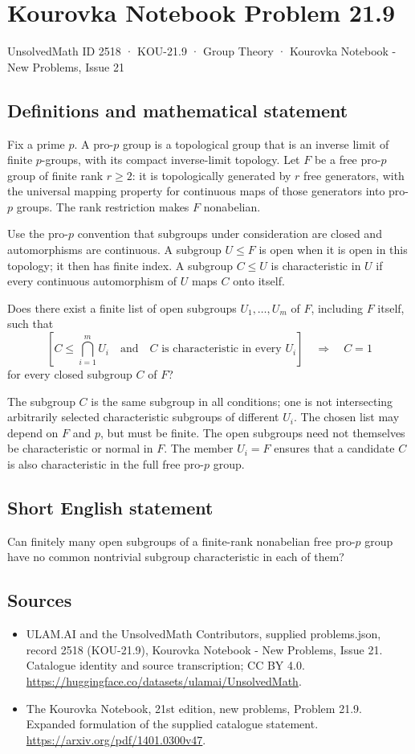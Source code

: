 \documentclass[11pt,a4paper]{article}
\begin{document}
\section*{Kourovka Notebook Problem 21.9}\label{2518}
{\small UnsolvedMath ID 2518 · KOU-21.9 · Group Theory · Kourovka Notebook - New Problems, Issue 21}
\subsection{Definitions and mathematical statement}
Fix a prime $p$. A pro-$p$ group is a topological group that is an
inverse limit of finite $p$-groups, with its compact inverse-limit topology.
Let $F$ be a free pro-$p$ group of finite rank $r\ge2$: it is topologically
generated by $r$ free generators, with the universal mapping property
for continuous maps of those generators into pro-$p$ groups.
The rank restriction makes $F$ nonabelian.

Use the pro-$p$ convention that subgroups under consideration are closed
and automorphisms are continuous. A subgroup $U\le F$ is open when it
is open in this topology; it then has finite index. A subgroup $C\le U$
is characteristic in $U$ if every continuous automorphism of $U$ maps
$C$ onto itself.

Does there exist a finite list of open subgroups $U_1,\ldots,U_m$ of
$F$, including $F$ itself, such that
\[
 \left[C\le\bigcap_{i=1}^m U_i\quad\text{and}\quad
       C\text{ is characteristic in every }U_i\right]
 \quad\Longrightarrow\quad C=1
\]
for every closed subgroup $C$ of $F$?

The subgroup $C$ is the same subgroup in all conditions; one is not
intersecting arbitrarily selected characteristic subgroups of different
$U_i$. The chosen list may depend on $F$ and $p$, but must be finite.
The open subgroups need not themselves be characteristic or normal in
$F$. The member $U_i=F$ ensures that a candidate $C$ is also characteristic
in the full free pro-$p$ group.
\subsection{Short English statement}
Can finitely many open subgroups of a finite-rank nonabelian free pro-$p$ group have no common nontrivial subgroup characteristic in each of them?
\subsection{Sources}
\begin{itemize}
\item[S1] ULAM.AI and the UnsolvedMath Contributors, supplied problems.json, record 2518 (KOU-21.9), Kourovka Notebook - New Problems, Issue 21. Catalogue identity and source transcription; CC BY 4.0.
\url{https://huggingface.co/datasets/ulamai/UnsolvedMath}.
\item[S2] The Kourovka Notebook, 21st edition, new problems, Problem 21.9. Expanded formulation of the supplied catalogue statement.
\url{https://arxiv.org/pdf/1401.0300v47}.
\end{itemize}
\end{document}
